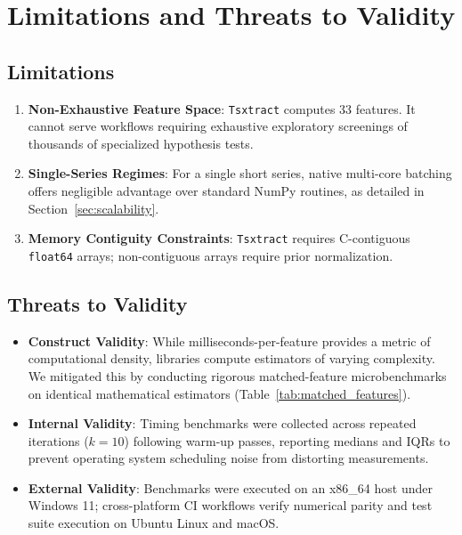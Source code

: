 \documentclass[conference]{IEEEtran}
\newcommand{\tsxtract}{\texttt{Tsxtract}}
\begin{document}
\section{Limitations and Threats to Validity}
\label{sec:threats_to_validity}

\subsection{Limitations}
\begin{enumerate}
    \item \textbf{Non-Exhaustive Feature Space}: \tsxtract{} computes 33 features. It cannot serve workflows requiring exhaustive exploratory screenings of thousands of specialized hypothesis tests.
    \item \textbf{Single-Series Regimes}: For a single short series, native multi-core batching offers negligible advantage over standard NumPy routines, as detailed in Section~\ref{sec:scalability}.
    \item \textbf{Memory Contiguity Constraints}: \tsxtract{} requires C-contiguous \texttt{float64} arrays; non-contiguous arrays require prior normalization.
\end{enumerate}

\subsection{Threats to Validity}
\begin{itemize}
    \item \textbf{Construct Validity}: While milliseconds-per-feature provides a metric of computational density, libraries compute estimators of varying complexity. We mitigated this by conducting rigorous matched-feature microbenchmarks on identical mathematical estimators (Table~\ref{tab:matched_features}).
    \item \textbf{Internal Validity}: Timing benchmarks were collected across repeated iterations ($k=10$) following warm-up passes, reporting medians and IQRs to prevent operating system scheduling noise from distorting measurements.
    \item \textbf{External Validity}: Benchmarks were executed on an x86\_64 host under Windows 11; cross-platform CI workflows verify numerical parity and test suite execution on Ubuntu Linux and macOS.
\end{itemize}
\end{document}
